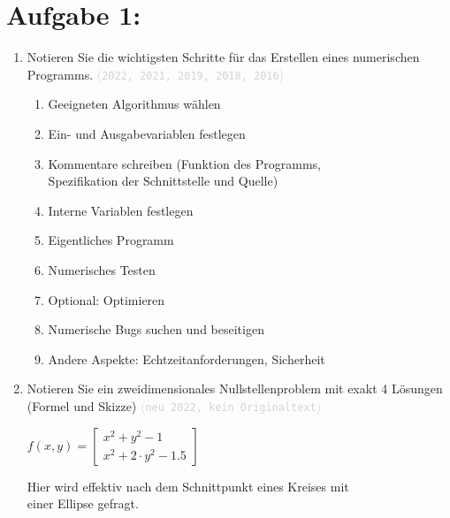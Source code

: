 \documentclass[12pt]{article}
\newcommand{\kommentarMacro}[1]{\textcolor{lightgray}{(\texttt{#1})}}
\begin{document}
\section*{Aufgabe 1:}
\begin{enumerate}
    \item Notieren Sie die wichtigsten Schritte für das Erstellen eines numerischen Programms. \kommentarMacro{2022, 2021, 2019, 2018, 2016}
          \begin{solution}
              \begin{enumerate}[label=$(\roman*)$]
                  \item Geeigneten Algorithmus wählen
                  \item Ein- und Ausgabevariablen festlegen
                  \item Kommentare schreiben (Funktion des Programms, \\Spezifikation der Schnittstelle und Quelle)
                  \item Interne Variablen festlegen
                  \item Eigentliches Programm
                  \item Numerisches Testen
                  \item Optional: Optimieren
                  \item Numerische Bugs suchen und beseitigen
                  \item Andere Aspekte: Echtzeitanforderungen, Sicherheit
              \end{enumerate}
          \end{solution}
    \item Notieren Sie ein zweidimensionales Nullstellenproblem mit exakt 4 Lösungen (Formel und Skizze) \kommentarMacro{neu 2022, kein Originaltext}
          \begin{solution}
              $f(x,y)=\begin{bmatrix}
                      x^2 + y^2 - 1 \\ x^2 + 2 \cdot y^2 - 1.5
                  \end{bmatrix}$ \hspace{1.5cm}
              \vspace{0.5cm}

              Hier wird effektiv nach dem Schnittpunkt eines Kreises mit \\ einer Ellipse gefragt.


\end{solution}
\end{enumerate}
\end{document}
